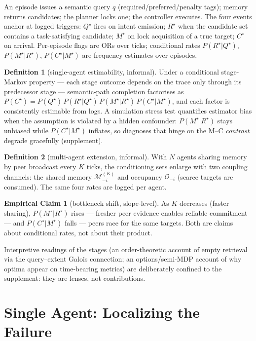 \documentclass[letterpaper]{article} %
\begin{document}
An episode issues a semantic query $q$ (required/preferred/penalty
tags); memory returns candidates; the planner locks one; the
controller executes. The four events anchor at logged triggers:
$Q^\star$ fires on intent emission; $R^\star$ when the candidate set
contains a task-satisfying candidate; $M^\star$ on lock acquisition of
a true target; $C^\star$ on arrival. Per-episode flags are ORs over
ticks; conditional rates $P(R^\star|Q^\star)$, $P(M^\star|R^\star)$,
$P(C^\star|M^\star)$ are frequency estimates over episodes.

\textbf{Definition 1} (single-agent estimability, informal). Under a
conditional stage-Markov property --- each stage outcome depends on
the trace only through its predecessor stage --- semantic-path
completion factorises as
$P(C^\star) = P(Q^\star)\,P(R^\star|Q^\star)\,P(M^\star|R^\star)\,
P(C^\star|M^\star)$, and each factor is consistently estimable from
logs. A simulation stress test quantifies estimator bias when the
assumption is violated by a hidden confounder: $P(M^\star|R^\star)$
stays unbiased while $P(C^\star|M^\star)$ inflates, so diagnoses that
hinge on the M--C \emph{contrast} degrade gracefully (supplement).

\textbf{Definition 2} (multi-agent extension, informal). With $N$
agents sharing memory by peer broadcast every $K$ ticks, the
conditioning sets enlarge with two coupling channels: the shared
memory $\mathcal{M}^{(K)}_{-i}$ and occupancy $\mathcal{O}_{-i}$
(scarce targets are consumed). The same four rates are logged per
agent.

\textbf{Empirical Claim 1} (bottleneck shift, slope-level). As $K$
decreases (faster sharing), $P(M^\star|R^\star)$ rises --- fresher
peer evidence enables reliable commitment --- and $P(C^\star|M^\star)$
falls --- peers race for the same targets. Both are claims about
conditional rates, not about their product.

Interpretive readings of the stages (an order-theoretic account of
empty retrieval via the query--extent Galois connection; an
options/semi-MDP account of why optima appear on time-bearing metrics)
are deliberately confined to the supplement: they are lenses, not
contributions.

\section{Single Agent: Localizing the Failure}
\label{sec:single}
\end{document}

